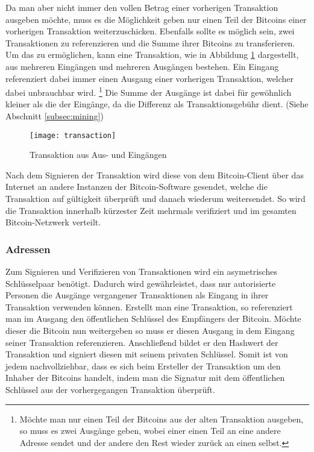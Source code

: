Da man aber nicht immer den vollen Betrag einer vorherigen Transaktion ausgeben möchte, muss es die Möglichkeit geben nur einen Teil der Bitcoins einer vorherigen Transaktion weiterzuschicken.
Ebenfalls sollte es möglich sein, zwei Transaktionen zu referenzieren und die Summe ihrer Bitcoins zu transferieren.
Um das zu ermöglichen, kann eine Transaktion, wie in Abbildung \ref{fig:transaction} dargestellt, aus mehreren Eingängen und mehreren Ausgängen bestehen.
Ein Eingang referenziert dabei immer einen Ausgang einer vorherigen Transaktion, welcher dabei unbrauchbar wird.%
\footnote{Möchte man nur einen Teil der Bitcoins aus der alten Transaktion ausgeben, so muss es zwei Ausgänge geben, wobei einer einen Teil an eine andere Adresse sendet und der andere den Rest wieder zurück an einen selbst.}
Die Summe der Ausgänge ist dabei für gewöhnlich kleiner als die der Eingänge, da die Differenz als Transaktionsgebühr dient. (Siehe Abschnitt \ref{subsec:mining})

\begin{figure}[htb]
    \begin{center}
        \texttt{[image: transaction]}
        \caption{Transaktion aus Aus- und Eingängen \parencite[5]{nakamoto}}
        \label{fig:transaction}
    \end{center}
\end{figure}

Nach dem Signieren der Transaktion wird diese von dem Bitcoin-Client über das Internet an andere Instanzen der Bitcoin-Software gesendet, welche die Transaktion auf gültigkeit überprüft und danach wiederum weitersendet.
So wird die Transaktion innerhalb kürzester Zeit mehrmals verifiziert und im gesamten Bitcoin-Netzwerk verteilt.

\subsubsection{Adressen}

Zum Signieren und Verifizieren von Transaktionen wird ein asymetrisches Schlüsselpaar benötigt.
Dadurch wird gewährleistet, dass nur autorisierte Personen die Ausgänge vergangener Transaktionen als Eingang in ihrer Transaktion verwenden können.
Erstellt man eine Transaktion, so referenziert man im Ausgang den öffentlichen Schlüssel des Empfängers der Bitcoin.
Möchte dieser die Bitcoin nun weitergeben so muss er diesen Ausgang in dem Eingang seiner Transaktion referenzieren.
Anschließend bildet er den Hashwert der Transaktion und signiert diesen mit seinem privaten Schlüssel.
Somit ist von jedem nachvollziehbar, dass es sich beim Ersteller der Transaktion um den Inhaber der Bitcoins handelt, indem man die Signatur mit dem öffentlichen Schlüssel aus der vorhergegangen Transaktion überprüft.

